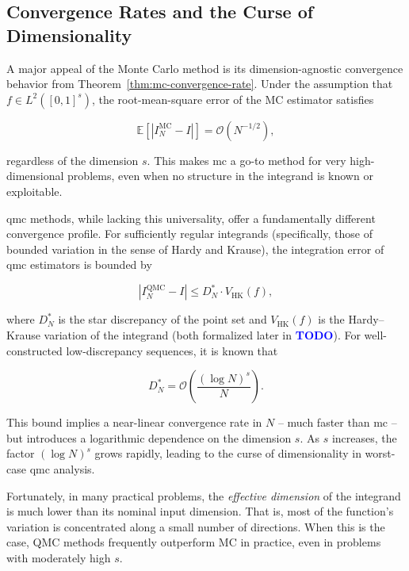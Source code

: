 \subsection{Convergence Rates and the Curse of Dimensionality}
\label{subsec:convergence-vs-dimension}

A major appeal of the Monte Carlo method is its dimension-agnostic convergence
behavior from Theorem~\ref{thm:mc-convergence-rate}. Under the assumption that
$f \in L^2([0,1]^s)$, the root-mean-square error of the MC estimator satisfies

\begin{equation}
    \mathbb{E}[ | I_N^{\mathrm{MC}} - I |] = \mathcal{O}(N^{-1/2}),
\end{equation}

regardless of the dimension $s$. This makes \ac{mc} a go-to method for very
high-dimensional problems, even when no structure in the integrand is known or
exploitable.

\ac{qmc} methods, while lacking this universality, offer a fundamentally
different convergence profile. For sufficiently regular integrands
(specifically, those of bounded variation in the sense of Hardy and Krause), the
integration error of \ac{qmc} estimators is bounded by

\begin{equation}
    | I_N^{\mathrm{QMC}} - I | \leq D_N^* \cdot V_{\mathrm{HK}}(f),
\end{equation}

where $D_N^*$ is the star discrepancy of the point set and $V_{\mathrm{HK}}(f)$
is the Hardy--Krause variation of the integrand (both formalized later in
\textcolor{blue}{\textbf{TODO}}). For well-constructed low-discrepancy
sequences, it is known that

\begin{equation}
    D_N^* = \mathcal{O}\left( \frac{(\log N)^s}{N} \right).
\end{equation}

This bound implies a near-linear convergence rate in $N$ -- much faster than
\ac{mc} -- but introduces a logarithmic dependence on the dimension $s$. As $s$
increases, the factor $(\log N)^s$ grows rapidly, leading to the curse of
dimensionality in worst-case \ac{qmc} analysis.

Fortunately, in many practical problems, the \emph{effective dimension} of the
integrand is much lower than its nominal input dimension. That is, most of the
function's variation is concentrated along a small number of directions. When
this is the case, QMC methods frequently outperform MC in practice, even in
problems with moderately high $s$.

